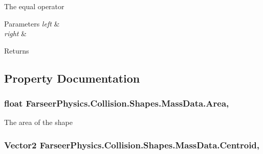The equal operator 


\begin{DoxyParams}{Parameters}
{\em left} & \\
\hline
{\em right} & \\
\hline
\end{DoxyParams}
\begin{DoxyReturn}{Returns}

\end{DoxyReturn}


\subsection{Property Documentation}
\hypertarget{struct_farseer_physics_1_1_collision_1_1_shapes_1_1_mass_data_a12c80c29e4f453f8dba95e6a9e415459}{
\subsubsection[{Area}]{\setlength{\rightskip}{0pt plus 5cm}float Farseer\+Physics.\+Collision.\+Shapes.\+Mass\+Data.\+Area\hspace{0.3cm}{\ttfamily [get]}, {\ttfamily [set]}}}\label{struct_farseer_physics_1_1_collision_1_1_shapes_1_1_mass_data_a12c80c29e4f453f8dba95e6a9e415459}


The area of the shape 

\hypertarget{struct_farseer_physics_1_1_collision_1_1_shapes_1_1_mass_data_a4393379c8a679569912715fda42bbe65}{
\subsubsection[{Centroid}]{\setlength{\rightskip}{0pt plus 5cm}Vector2 Farseer\+Physics.\+Collision.\+Shapes.\+Mass\+Data.\+Centroid\hspace{0.3cm}{\ttfamily [get]}, {\ttfamily [set]}}}\label{struct_farseer_physics_1_1_collision_1_1_shapes_1_1_mass_data_a4393379c8a679569912715fda42bbe65}


